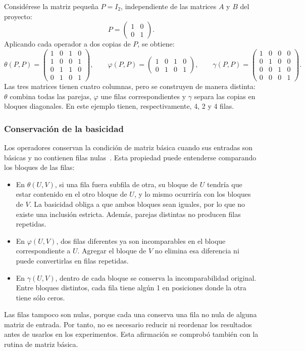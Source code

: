 Considérese la matriz pequeña $P=I_2$, independiente de las matrices
$A$ y $B$ del proyecto:
\[
P=\begin{pmatrix}1&0\\0&1\end{pmatrix}.
\]
Aplicando cada operador a dos copias de $P$, se obtiene:
\[
\theta(P,P)=\begin{pmatrix}
1&0&1&0\\1&0&0&1\\0&1&1&0\\0&1&0&1
\end{pmatrix},\qquad
\varphi(P,P)=\begin{pmatrix}
1&0&1&0\\0&1&0&1
\end{pmatrix},\qquad
\gamma(P,P)=\begin{pmatrix}
1&0&0&0\\0&1&0&0\\0&0&1&0\\0&0&0&1
\end{pmatrix}.
\]
Las tres matrices tienen cuatro columnas, pero se construyen de
manera distinta: $\theta$ combina todas las parejas, $\varphi$ une
filas correspondientes y $\gamma$ separa las copias en bloques
diagonales. En este ejemplo tienen, respectivamente, 4, 2 y 4 filas.

\subsubsection*{Conservación de la basicidad}

Los operadores conservan la condición de matriz básica cuando sus
entradas son básicas y no contienen filas nulas~\cite{alba2016}. Esta propiedad puede entenderse
comparando los bloques de las filas:
\begin{itemize}[nosep]
\item En $\theta(U,V)$, si una fila fuera subfila de otra, su bloque
de $U$ tendría que estar contenido en el otro bloque de $U$, y lo
mismo ocurriría con los bloques de $V$. La basicidad obliga a que
ambos bloques sean iguales, por lo que no existe una inclusión estricta.
Además, parejas distintas no producen filas repetidas.
\item En $\varphi(U,V)$, dos filas diferentes ya son incomparables
en el bloque correspondiente a $U$. Agregar el bloque de $V$ no
elimina esa diferencia ni puede convertirlas en filas repetidas.
\item En $\gamma(U,V)$, dentro de cada bloque se conserva la
incomparabilidad original. Entre bloques distintos, cada fila
tiene algún 1 en posiciones donde la otra tiene sólo ceros.
\end{itemize}
Las filas tampoco son nulas, porque cada una conserva una fila
no nula de alguna matriz de entrada. Por tanto, no es necesario
reducir ni reordenar los resultados antes de usarlos en los experimentos.
Esta afirmación se comprobó también con la rutina de matriz básica.

